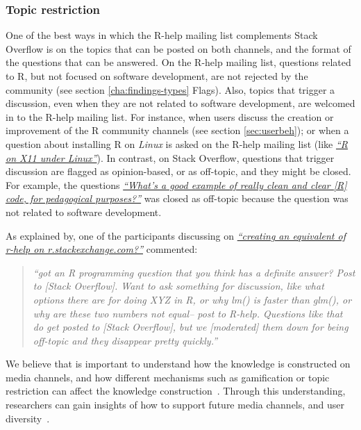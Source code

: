 \documentclass{sig-alternate-05-2015}
\begin{document}
	\subsubsection{Topic restriction}

	One of the best ways in which the R-help mailing list complements Stack Overflow is on the topics that can be posted on both channels, and the format of the questions that can be answered. 
	On the R-help mailing list, questions related to R, but not focused on software development, are not rejected by the community (see section \ref{cha:findings-types} Flags).
	Also, topics that trigger a discussion, even when they are not related to software development, are welcomed in to the R-help mailing list.
	For instance, when users discuss the creation or improvement of the R community channels (see section \ref{sec:userbeh}); or when a question about installing R on \textit{Linux} is asked on the R-help mailing list (like {\href{http://goo.gl/1JLOUF}{\textit{``R on X11 under Linux''}}}).
	In contrast, on Stack Overflow, questions that trigger discussion are flagged as opinion-based, or as off-topic, and they might be closed. 
	For example, the questions \textit{\href{http://goo.gl/9JjZW1}{``What's a good example of really clean and clear [R] code, for pedagogical purposes?''}} was closed as off-topic because the question was not related to software development.


	As explained by, one of the participants discussing on \textit{\href{http://goo.gl/mTccwx}{``creating an equivalent of r-help on r.stackexchange.com?''}} commented:
	\begin{quote}
	    \textit{``got an R programming question that you think has a definite answer? Post to [Stack Overflow]. Want to ask something for discussion, like what options there are for doing XYZ in R, or why lm() is faster than glm(), or why are these two numbers not equal-- post to R-help. Questions like that do get posted to [Stack Overflow], but we [moderated] them down for being off-topic and they disappear pretty quickly.''}
    \end{quote}

	We believe that is important to understand how the knowledge is constructed on media channels, and how different mechanisms such as gamification or topic restriction can affect the knowledge construction~\cite{Li2015}.
	Through this understanding, researchers can gain insights of how to support future media channels, and user diversity~\cite{Vasilescu2014b}.
\end{document}
